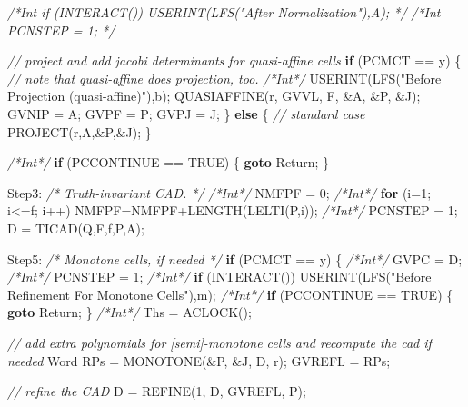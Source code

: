 \documentclass[
]{book}
\newenvironment{Shaded}{\begin{snugshade}}{\end{snugshade}}
\newcommand{\CharTok}[1]{\textcolor[rgb]{0.31,0.60,0.02}{#1}}
\newcommand{\CommentTok}[1]{\textcolor[rgb]{0.56,0.35,0.01}{\textit{#1}}}
\newcommand{\ControlFlowTok}[1]{\textcolor[rgb]{0.13,0.29,0.53}{\textbf{#1}}}
\newcommand{\DecValTok}[1]{\textcolor[rgb]{0.00,0.00,0.81}{#1}}
\newcommand{\NormalTok}[1]{#1}
\newcommand{\StringTok}[1]{\textcolor[rgb]{0.31,0.60,0.02}{#1}}
\theoremstyle{definition}
\theoremstyle{definition}
\theoremstyle{definition}
\theoremstyle{definition}
\theoremstyle{remark}
\begin{document}
\begin{Shaded}
\begin{Highlighting}[numbers=left,,]
    \CommentTok{/*Int if (INTERACT()) USERINT(LFS("After Normalization"),\textquotesingle{}A\textquotesingle{}); */}
    \CommentTok{/*Int PCNSTEP = 1; */}

    \CommentTok{// project and add jacobi determinants for quasi{-}affine cells}
    \ControlFlowTok{if}\NormalTok{ (PCMCT == }\CharTok{\textquotesingle{}y\textquotesingle{}}\NormalTok{) \{}
        \CommentTok{// note that quasi{-}affine does projection, too.}
        \CommentTok{/*Int*/}\NormalTok{     USERINT(LFS(}\StringTok{"Before Projection (quasi{-}affine)"}\NormalTok{),}\CharTok{\textquotesingle{}b\textquotesingle{}}\NormalTok{);}
\NormalTok{        QUASIAFFINE(r, GVVL, F, \&A, \&P, \&J);}
\NormalTok{        GVNIP = A;}
\NormalTok{        GVPF = P;}
\NormalTok{        GVPJ = J;}
\NormalTok{    \} }\ControlFlowTok{else}\NormalTok{ \{ }\CommentTok{// standard case}
\NormalTok{        PROJECT(r,A,\&P,\&J);}
\NormalTok{    \}}

    \CommentTok{/*Int*/} \ControlFlowTok{if}\NormalTok{ (PCCONTINUE == TRUE) \{ }\ControlFlowTok{goto}\NormalTok{ Return; \}}

\NormalTok{Step3: }\CommentTok{/* Truth{-}invariant CAD. */}
    \CommentTok{/*Int*/}\NormalTok{ NMFPF = }\DecValTok{0}\NormalTok{;}
    \CommentTok{/*Int*/} \ControlFlowTok{for}\NormalTok{ (i=}\DecValTok{1}\NormalTok{; i\textless{}=f; i++) NMFPF=NMFPF+LENGTH(LELTI(P,i));}
    \CommentTok{/*Int*/}\NormalTok{ PCNSTEP = }\DecValTok{1}\NormalTok{;}
\NormalTok{    D = TICAD(Q,F,f,P,A);}

\NormalTok{Step5: }\CommentTok{/* Monotone cells, if needed */}
    \ControlFlowTok{if}\NormalTok{ (PCMCT == }\CharTok{\textquotesingle{}y\textquotesingle{}}\NormalTok{) \{}
        \CommentTok{/*Int*/}\NormalTok{ GVPC = D;}
        \CommentTok{/*Int*/}\NormalTok{ PCNSTEP = }\DecValTok{1}\NormalTok{;}
        \CommentTok{/*Int*/} \ControlFlowTok{if}\NormalTok{ (INTERACT()) USERINT(LFS(}\StringTok{"Before Refinement For Monotone Cells"}\NormalTok{),}\CharTok{\textquotesingle{}m\textquotesingle{}}\NormalTok{);}
        \CommentTok{/*Int*/} \ControlFlowTok{if}\NormalTok{ (PCCONTINUE == TRUE) \{ }\ControlFlowTok{goto}\NormalTok{ Return; \}}
        \CommentTok{/*Int*/}\NormalTok{ Ths = ACLOCK();}

        \CommentTok{// add extra polynomials for [semi]{-}monotone cells and recompute the cad if needed}
\NormalTok{        Word RPs = MONOTONE(\&P, \&J, D, r);}
\NormalTok{        GVREFL = RPs;}

        \CommentTok{// refine the CAD}
\NormalTok{        D = REFINE(}\DecValTok{1}\NormalTok{, D, GVREFL, P);}


\end{Highlighting}
\end{Shaded}
\end{document}
